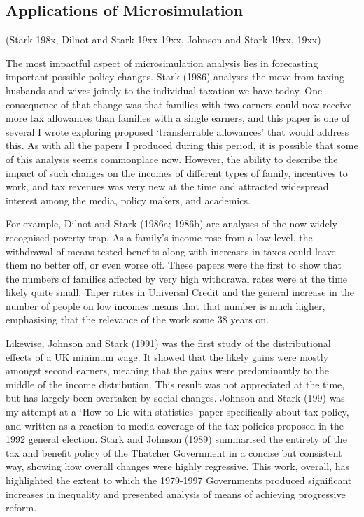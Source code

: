\documentclass[
  letterpaper,
  DIV=11,
  numbers=noendperiod]{scrartcl}
\begin{document}
\subsection{Applications of
Microsimulation}\label{applications-of-microsimulation}

(Stark 198x, Dilnot and Stark 19xx 19xx, Johnson and Stark 19xx, 19xx)

The most impactful aspect of microsimulation analysis lies in
forecasting important possible policy changes. Stark (1986) analyses the
move from taxing husbands and wives jointly to the individual taxation
we have today. One consequence of that change was that families with two
earners could now receive more tax allowances than families with a
single earners, and this paper is one of several I wrote exploring
proposed `transferrable allowances' that would address this. As with all
the papers I produced during this period, it is possible that some of
this analysis seems commonplace now. However, the ability to describe
the impact of such changes on the incomes of different types of family,
incentives to work, and tax revenues was very new at the time and
attracted widespread interest among the media, policy makers, and
academics.

For example, Dilnot and Stark (1986a; 1986b) are analyses of the now
widely-recognised poverty trap. As a family's income rose from a low
level, the withdrawal of means-tested benefits along with increases in
taxes could leave them no better off, or even worse off. These papers
were the first to show that the numbers of families affected by very
high withdrawal rates were at the time likely quite small. Taper rates
in Universal Credit and the general increase in the number of people on
low incomes means that that number is much higher, emphasising that the
relevance of the work some 38 years on.

Likewise, Johnson and Stark (1991) was the first study of the
distributional effects of a UK minimum wage. It showed that the likely
gains were mostly amongst second earners, meaning that the gains were
predominantly to the middle of the income distribution. This result was
not appreciated at the time, but has largely been overtaken by social
changes. Johnson and Stark (199) was my attempt at a `How to Lie with
statistics' paper specifically about tax policy, and written as a
reaction to media coverage of the tax policies proposed in the 1992
general election. Stark and Johnson (1989) summarised the entirety of
the tax and benefit policy of the Thatcher Government in a concise but
consistent way, showing how overall changes were highly regressive. This
work, overall, has highlighted the extent to which the 1979-1997
Governments produced significant increases in inequality and presented
analysis of means of achieving progressive reform.
\end{document}
